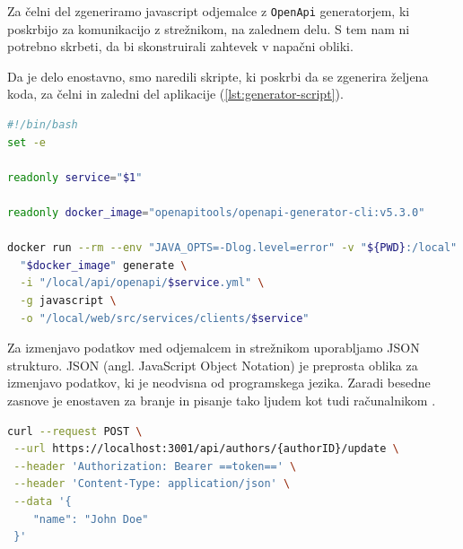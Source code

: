 \documentclass[a4paper, 12pt]{book}
\begin{document}
Za čelni del zgeneriramo javascript odjemalce z \verb=OpenApi= generatorjem, ki poskrbijo za komunikacijo z strežnikom, na zalednem delu. S tem nam ni potrebno skrbeti, da bi skonstruirali zahtevek v napačni obliki.

Da je delo enostavno, smo naredili skripte, ki poskrbi da se zgenerira željena koda, za čelni in zaledni del aplikacije (\ref{lst:generator-script}).

\begin{lstlisting}[language=bash, style=mystyle,caption={Skripta, ki poskrbi za generiranje kode za posamezno storitev},label=lst:generator-script]
#!/bin/bash
set -e

readonly service="$1"

readonly docker_image="openapitools/openapi-generator-cli:v5.3.0"

docker run --rm --env "JAVA_OPTS=-Dlog.level=error" -v "${PWD}:/local" \
  "$docker_image" generate \
  -i "/local/api/openapi/$service.yml" \
  -g javascript \
  -o "/local/web/src/services/clients/$service"
\end{lstlisting}

Za izmenjavo podatkov med odjemalcem in strežnikom uporabljamo JSON strukturo. JSON (angl. JavaScript Object Notation) je preprosta oblika za izmenjavo podatkov, ki je neodvisna od programskega jezika. Zaradi besedne zasnove je enostaven za branje in pisanje tako ljudem kot tudi računalnikom \cite{json-rfc}.

\begin{lstlisting}[language=bash, style=mystyle,caption={Primer izvedbe API klica in odgovora},label=lst:api-call-example]
 curl --request POST \
 --url https://localhost:3001/api/authors/{authorID}/update \
 --header 'Authorization: Bearer ==token==' \
 --header 'Content-Type: application/json' \
 --data '{
    "name": "John Doe"
 }'
\end{lstlisting}
\end{document}

